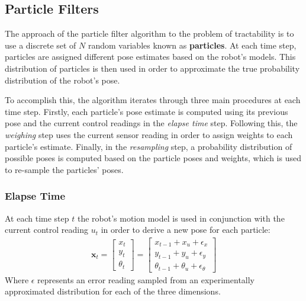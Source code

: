 \documentclass[letterpaper, 10 pt, conference]{ieeeconf}  %
\begin{document}
\subsection{Particle Filters}

The approach of the particle filter algorithm to the problem of tractability is to use a discrete set of $N$ random variables known as \textbf{particles}. At each time step, particles are assigned different pose estimates based on the robot's models. This distribution of particles is then used in order to approximate the true probability distribution of the robot's pose. 
\par
To accomplish this, the algorithm iterates through three main procedures at each time step. Firstly, each particle's pose estimate is computed using its previous pose and the current control readings in the \textit{elapse time} step. Following this, the \textit{weighing} step uses the current sensor reading in order to assign weights to each particle's estimate. Finally, in the \textit{resampling} step, a probability distribution of possible poses is computed based on the particle poses and weights, which is used to re-sample the particles' poses. 

\subsubsection{Elapse Time}
At each time step $t$ the robot's motion model is used in conjunction with the current control reading $u_t$ in order to derive a new pose for each particle:
\begin{align*}
\textbf{x}_t = \begin{bmatrix}
				x_t \\
				y_t \\
				\theta _t
				\end{bmatrix} 
				=
				\begin{bmatrix}
				x_{t-1} + x_u + \epsilon _x\\
				y_{t-1} + y_u + \epsilon _y\\
				\theta _{t-1} + \theta _u + \epsilon _\theta				
				\end{bmatrix}
\end{align*}
Where $\epsilon$ represents an error reading sampled from an experimentally approximated distribution for each of the three dimensions. 
\end{document}
